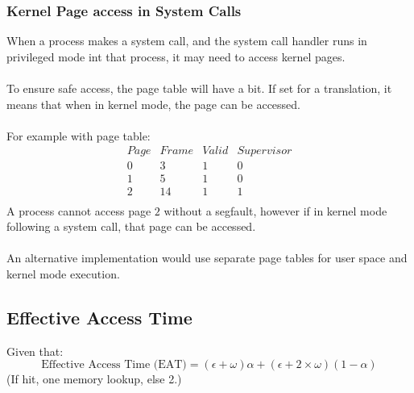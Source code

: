 \documentclass{report}
\begin{document}
            \subsubsection*{Kernel Page access in System Calls}
                When a process makes a system call, and the system call handler runs in privileged mode int that process, it may need to access kernel pages.
                \\
                \\ To ensure safe access, the page table will have a  bit. If set for a translation, it means that when in kernel mode, the page can be accessed.
                \\
                \\ For example with page table:
                \[\begin{matrix}
                    Page & Frame & Valid & Supervisor \\
                    0    & 3     & 1     & 0 \\
                    1    & 5     & 1     & 0 \\
                    2    & 14    & 1     & 1 \\
                \end{matrix}\]
                A process cannot access page $2$ without a segfault, however if in kernel mode following a system call, that page can be accessed.
                \\
                \\ An alternative implementation would use separate page tables for user space and kernel mode execution.
        
        \subsection*{Effective Access Time}
            Given that:
            \[\text{Effective Access Time (EAT)} = (\epsilon + \omega) \alpha + (\epsilon + 2 \times \omega)(1 - \alpha)\]
            (If hit, one memory lookup, else 2.)
        \\
\end{document}
